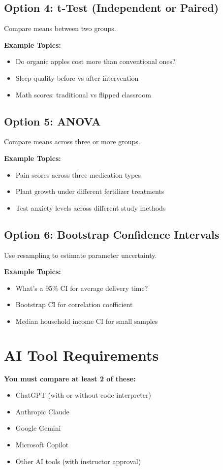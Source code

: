 \documentclass[11pt]{article}
\begin{document}
\subsection{Option 4: t-Test (Independent or Paired)}
Compare means between two groups.

\textbf{Example Topics:}
\begin{itemize}
\item Do organic apples cost more than conventional ones?
\item Sleep quality before vs after intervention
\item Math scores: traditional vs flipped classroom
\end{itemize}

\subsection{Option 5: ANOVA}
Compare means across three or more groups.

\textbf{Example Topics:}
\begin{itemize}
\item Pain scores across three medication types
\item Plant growth under different fertilizer treatments
\item Test anxiety levels across different study methods
\end{itemize}

\subsection{Option 6: Bootstrap Confidence Intervals}
Use resampling to estimate parameter uncertainty.

\textbf{Example Topics:}
\begin{itemize}
\item What's a 95\% CI for average delivery time?
\item Bootstrap CI for correlation coefficient
\item Median household income CI for small samples
\end{itemize}

\section{AI Tool Requirements}

\textbf{You must compare at least 2 of these:}
\begin{itemize}
\item ChatGPT (with or without code interpreter)
\item Anthropic Claude
\item Google Gemini
\item Microsoft Copilot
\item Other AI tools (with instructor approval)
\end{itemize}
\end{document}
